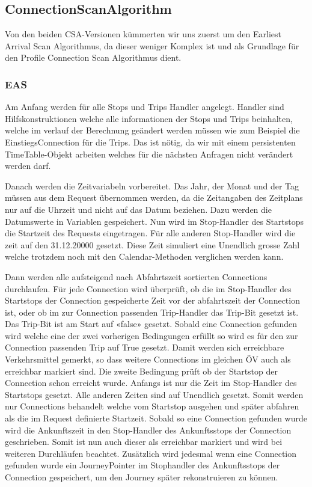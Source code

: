 \subsection{ConnectionScanAlgorithm}
Von den beiden CSA-Versionen\cite{csa} kümmerten wir uns zuerst um den Earliest Arrival Scan Algorithmus, da dieser weniger Komplex ist und als Grundlage für den Profile Connection Scan Algorithmus dient.
\subsubsection{EAS}
Am Anfang werden für alle Stops und Trips Handler angelegt. Handler sind Hilfskonstruktionen welche alle informationen der Stops und Trips beinhalten, welche im verlauf der Berechnung geändert werden müssen wie zum Beispiel die EinstiegsConnection für die Trips. Das ist nötig, da wir mit einem persistenten TimeTable-Objekt arbeiten welches für die nächsten Anfragen nicht verändert werden darf.
\newline


Danach werden die Zeitvariabeln vorbereitet. Das Jahr, der Monat und der Tag müssen aus dem Request übernommen werden, da die Zeitangaben des Zeitplans nur auf die Uhrzeit und nicht auf das Datum beziehen. Dazu werden die Datumswerte in Variablen gespeichert.  Nun wird im Stop-Handler des Startstops die Startzeit des Requests eingetragen. Für alle anderen Stop-Handler wird die zeit auf den 31.12.20000 gesetzt. Diese Zeit simuliert eine Unendlich grosse Zahl welche trotzdem noch mit den Calendar-Methoden verglichen werden kann.
\newline


Dann werden alle aufsteigend nach Abfahrtszeit sortierten Connections durchlaufen. Für jede Connection wird überprüft, ob die im Stop-Handler des Startstops der Connection gespeicherte Zeit vor der abfahrtszeit der Connection ist, oder ob im zur Connection passenden Trip-Handler das Trip-Bit gesetzt ist. Das Trip-Bit ist am Start auf «false» gesetzt. Sobald eine Connection gefunden wird welche eine der zwei vorherigen Bedingungen erfüllt so wird es für den zur Connection passenden Trip auf True gesetzt. Damit werden sich erreichbare Verkehrsmittel gemerkt, so dass weitere Connections im gleichen ÖV auch als erreichbar markiert sind. Die zweite Bedingung prüft ob der Startstop der Connection schon erreicht wurde. Anfangs ist nur die Zeit im Stop-Handler des Startstops gesetzt. Alle anderen Zeiten sind auf Unendlich gesetzt. Somit werden nur Connections behandelt welche vom Startstop ausgehen und später abfahren als die im Request definierte Startzeit. Sobald so eine Connection gefunden wurde wird die Ankunftszeit in den Stop-Handler des Ankunftsstops der Connection geschrieben. Somit ist nun auch dieser als erreichbar markiert und wird bei weiteren Durchläufen beachtet. Zusätzlich wird jedesmal wenn eine Connection gefunden wurde ein JourneyPointer im Stophandler des Ankunftsstops der Connection gespeichert, um den Journey später rekonstruieren zu können.
\newline


